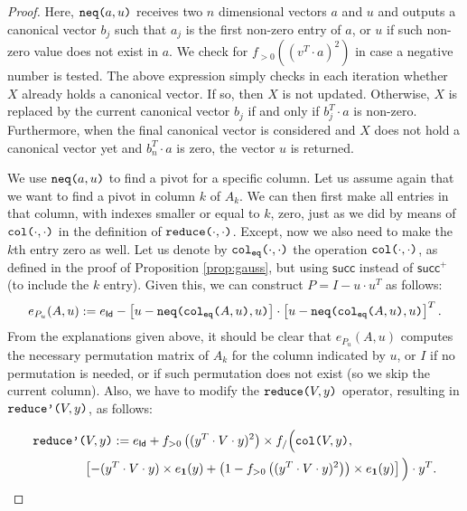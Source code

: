 \begin{proof}

    Here, $\texttt{neq(}a,u\texttt{)}$ receives two $n$ dimensional vectors $a$ and $u$ and outputs a 
    canonical vector $b_j$ such that $a_j$ is the first non-zero entry of $a$, or $u$ if such non-zero value does not exist in $a$. We check for $f_{>0}((v^T\cdot a)^2)$ 
    in case a negative number is tested. The above expression simply checks in each iteration
    whether $X$ already holds a canonical vector. If so, then $X$ is not updated. Otherwise,
    $X$ is replaced by the current canonical vector $b_j$ if and only if $b_j^T\cdot a$ is non-zero. Furthermore, when the final canonical vector is considered and $X$ does not hold
    a canonical vector yet and $b_n^T\cdot a$ is zero, the vector $u$ is returned.

    We use $\texttt{neq(}a,u\texttt{)}$ to find a pivot for a specific column. Let us assume again that we
    want to find a pivot in column $k$ of $A_k$. We can then first make all entries in that column, with indexes smaller or equal to $k$, zero, just as we did by means of $\texttt{col(}\cdot,\cdot\texttt{)}$ in the
    definition of $\texttt{reduce(}\cdot,\cdot\texttt{)}$. Except, now we also need to make the $k$th entry zero as well.
    Let us denote by $\texttt{col}_{\texttt{eq}}\texttt{(}\cdot,\cdot\texttt{)}$ the operation $\texttt{col(}\cdot,\cdot\texttt{)}$, as defined in the proof of Proposition \ref{prop:gauss}, but using $\mathsf{succ}$ instead of $\mathsf{succ}^+$ (to include the $k$ entry). Given this, we can construct $P=I-u\cdot u^T$ as follows:
    $$
    e_{P_u}(A,u) := e_{\mathsf{Id}} - \left[ u - \texttt{neq(} \texttt{col}_{\texttt{eq}}\texttt{(}A,u\texttt{)} ,u\texttt{)} \right]\cdot \left[ u - \texttt{neq(} \texttt{col}_{\texttt{eq}}\texttt{(}A,u\texttt{)} ,u\texttt{)} \right]^T.
    $$ 
    From the explanations given above, it should be clear that $e_{P_u}(A,u)$ computes the necessary permutation matrix of $A_k$ for the column indicated by $u$, or $I$
    if no permutation is needed, or if such permutation does not exist (so we skip the current column). Also, we have to modify the $\texttt{reduce(}V,y\texttt{)}$ operator, resulting in $\texttt{reduce'(}V,y\texttt{)}$, as follows:

    \begin{align*}
        &\texttt{reduce'(}V,y\texttt{)}:= e_{\mathsf{Id}}+ f_{>0}\left( ( y^T\cdot V\cdot y)^2 \right)\times f_/\Big(\texttt{col(}V,y\texttt{)}, \\
        &\hspace{4em}\left[ -(y^T\cdot V\cdot y)\times e_{\mathbf{1}}(y) + \left( 1 - f_{>0}\left( ( y^T\cdot V\cdot y)^2 \right) \right)\times e_{\mathbf{1}}(y) \right]\Big)\cdot y^T. \\
    \end{align*}


\end{proof}
